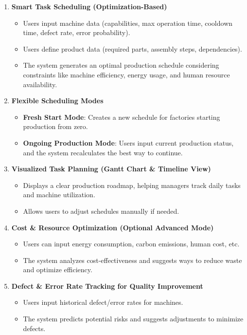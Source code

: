 \begin{enumerate}[leftmargin=80pt]
    \item \textbf{Smart Task Scheduling (Optimization-Based)}
    \begin{itemize}
        \item Users input machine data (capabilities, max operation time, cooldown time, defect rate, error probability).
        \item Users define product data (required parts, assembly steps, dependencies).
        \item The system generates an optimal production schedule considering constraints like machine efficiency, energy usage, and human resource availability.
    \end{itemize}

    \item \textbf{Flexible Scheduling Modes}
    \begin{itemize}
        \item \textbf{Fresh Start Mode}: Creates a new schedule for factories starting production from zero.
        \item \textbf{Ongoing Production Mode}: Users input current production status, and the system recalculates the best way to continue.
    \end{itemize}

    \item \textbf{Visualized Task Planning (Gantt Chart \& Timeline View)}
    \begin{itemize}
        \item Displays a clear production roadmap, helping managers track daily tasks and machine utilization.
        \item Allows users to adjust schedules manually if needed.
    \end{itemize}

    \item \textbf{Cost \& Resource Optimization (Optional Advanced Mode)}
    \begin{itemize}
        \item Users can input energy consumption, carbon emissions, human cost, etc.
        \item The system analyzes cost-effectiveness and suggests ways to reduce waste and optimize efficiency.
    \end{itemize}

    \item \textbf{Defect \& Error Rate Tracking for Quality Improvement}
    \begin{itemize}
        \item Users input historical defect/error rates for machines.
        \item The system predicts potential risks and suggests adjustments to minimize defects.
    \end{itemize}
\end{enumerate}

